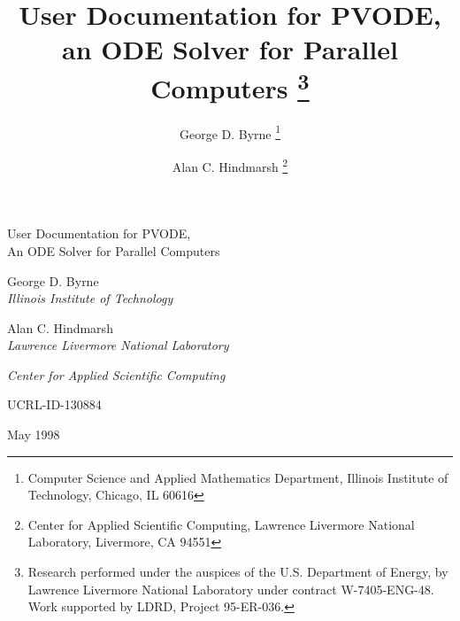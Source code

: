 



\setlength{\oddsidemargin}{0in}   %
\setlength{\evensidemargin}{0in}  %
\setlength{\textwidth}{6.5in}     %


\title{User Documentation for PVODE, an ODE Solver for Parallel
Computers%
\thanks{
Research performed under the auspices of the U.S.
Department of Energy, by Lawrence Livermore National Laboratory under
contract W-7405-ENG-48.  Work supported by LDRD, Project 95-ER-036.} }

\author{George D. Byrne%
\thanks{Computer Science and Applied Mathematics Department,
Illinois Institute of Technology, Chicago, IL 60616}
\and
Alan C. Hindmarsh%
\thanks{Center for Applied Scientific Computing, 
Lawrence Livermore National Laboratory, Livermore, CA 94551}}




%
%
% 


\thispagestyle{empty}

%
\vspace*{\fill}
\vspace*{0.1in}

\begin{center}
%
\LARGE
User Documentation for PVODE, \\ An ODE Solver for Parallel Computers
%
\par\vspace*{0.7in}
\large
George D. Byrne\\{\em Illinois Institute of Technology}
\par\bigskip
Alan C. Hindmarsh\\{\em Lawrence Livermore National Laboratory}
\end{center}

\vfill
\mbox{}
\vfill
\vspace*{3.5in}

%
%
\par\Large\it Center for Applied Scientific Computing
\vspace*{0.7in}
\par\large UCRL-ID-130884
\par\large May 1998


